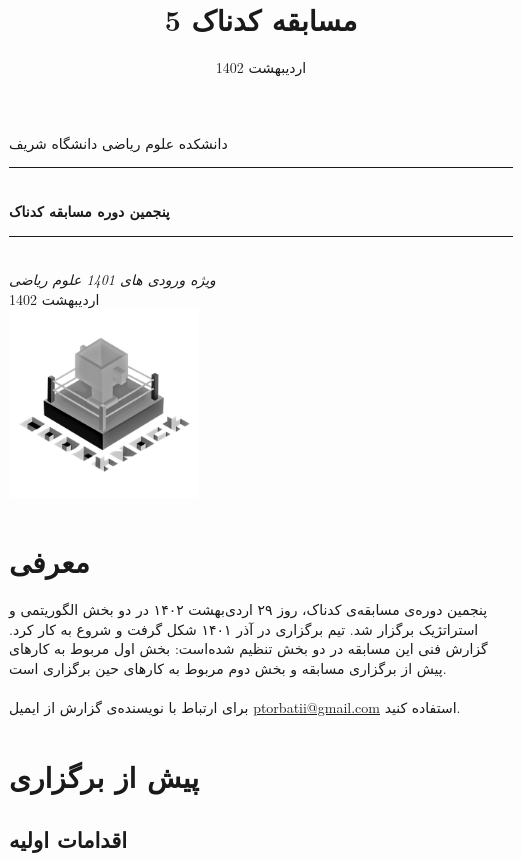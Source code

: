 \documentclass{report}
\title{مسابقه کدناک 5}
\author{}
\date{اردیبهشت 1402}
\begin{document}
\begin{titlepage}
\newcommand{\HRule}{\rule{\linewidth}{0.5mm}}
\center 
\textsc{\LARGE دانشکده علوم ریاضی دانشگاه شریف}\\[1.5cm] 
\HRule \\[0.4cm]
{ \huge \bfseries پنجمین دوره مسابقه کدناک}\\[0.4cm]
\HRule \\[1.5cm]
\Large \emph{ویژه ورودی های 1401 علوم ریاضی}\\
{\large اردیبهشت 1402}\\[2cm] 
\includegraphics[width = 5cm]{images/CodeKnock.png}\\[1cm] 
\vfill 
\end{titlepage}

\tableofcontents 
\pagebreak

\chapter{معرفی}
پنجمین دوره‌ی مسابقه‌ی کدناک، روز ۲۹ اردی‌بهشت ۱۴۰۲ در دو بخش الگوریتمی و استراتژیک برگزار شد. تیم برگزاری در آذر ۱۴۰۱ شکل گرفت و شروع به کار کرد. گزارش فنی این مسابقه در دو بخش تنظیم شده‌است: بخش اول مربوط به کارهای پیش از برگزاری مسابقه و بخش دوم مربوط به کارهای حین برگزاری است. \\\\
برای ارتباط با نویسنده‌ی گزارش از ایمیل \href{mailto:ptorbatii@gmail.com}{ptorbatii@gmail.com} استفاده کنید.
\pagebreak

\chapter{پیش از برگزاری}
\localtableofcontents
\pagebreak

\section{اقدامات اولیه}
\end{document}
